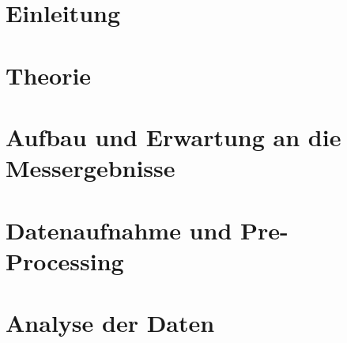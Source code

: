 \documentclass[11pt,a4paper,twoside,headsepline,numbers=noenddot,toc=bibliography,cleardoublepage=empty,parskip=half,DIV=calc,BCOR=6mm,pagesize=pdftex]{article}
\begin{document}
	
\pagestyle{empty}





\clearpage
\mbox{}
\clearpage
\pagestyle{plain}


\tableofcontents
\clearpage
\mbox{}
\clearpage
{}
\setcounter{page}{1}
 

\listoftodos \clearpage
\section{Einleitung}
\label{sec:Einleitung}

\clearpage
\mbox{}
\clearpage

\section{Theorie}
\label{sec:Theorie}

\clearpage
\mbox{}
\clearpage

\section{Aufbau und Erwartung an die Messergebnisse}
\label{sec:Aufbau}

\clearpage
\mbox{}
\clearpage

\section{Datenaufnahme und Pre-Processing}
\label{sec:Datenaufnahme und Pre-Processing}

\clearpage
\mbox{}
\clearpage

\section{Analyse der Daten}
\label{sec:Analyse}

\clearpage
\mbox{}
\clearpage
\end{document}
